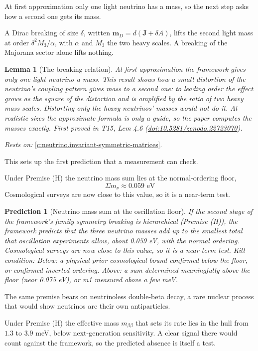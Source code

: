 \documentclass[11pt]{article}
\newtheorem{lemma}[theorem]{Lemma}
\newtheorem{prediction}[theorem]{Prediction}
\theoremstyle{definition}
\theoremstyle{plain}
\providecommand{\J}{}\renewcommand{\J}{\mathbf{J}}
\providecommand{\mD}{}\renewcommand{\mD}{\mathbf{m}_{D}}
\providecommand{\mnu}{}\renewcommand{\mnu}{\Sigma m_{\nu}}
\begin{document}
At first approximation only one light neutrino has a mass, so the next step asks how a second one gets its mass.

A Dirac breaking of size $\delta$, written $\mD = d(\J + \delta A)$, lifts the second light mass at order $\delta^{2}M_{3}/\alpha$, with $\alpha$ and $M_{3}$ the two heavy scales. A breaking of the Majorana sector alone lifts nothing.

\begin{lemma}[The breaking relation]\label{c:neutrino.breaking-relation}
At first approximation the framework gives only one light neutrino a mass. This result shows how a small distortion of the neutrino's coupling pattern gives mass to a second one: to leading order the effect grows as the square of the distortion and is amplified by the ratio of two heavy mass scales. Distorting only the heavy neutrinos' masses would not do it. At realistic sizes the approximate formula is only a guide, so the paper computes the masses exactly.
\emph{First proved in} T15, Lem 4.6 (\href{https://doi.org/10.5281/zenodo.22723070}{doi:10.5281/zenodo.22723070}).
\end{lemma}
\noindent\emph{Rests on:} \ref{c:neutrino.invariant-symmetric-matrices}.

This sets up the first prediction that a measurement can check.

Under Premise (H) the neutrino mass sum lies at the normal-ordering floor, \[ \mnu \approx 0.059 \text{ eV} \] Cosmological surveys are now close to this value, so it is a near-term test.

\begin{prediction}[Neutrino mass sum at the oscillation floor]\label{c:pred.neutrino-mass-sum-floor}
If the second stage of the framework's family symmetry breaking is hierarchical (Premise (H)), the framework predicts that the three neutrino masses add up to the smallest total that oscillation experiments allow, about 0.059 eV, with the normal ordering. Cosmological surveys are now close to this value, so it is a near-term test.
\emph{Kill condition:} Below: a physical-prior cosmological bound confirmed below the floor, or confirmed inverted ordering. Above: a sum determined meaningfully above the floor (near 0.075 eV), or m1 measured above a few meV.
\end{prediction}

The same premise bears on neutrinoless double-beta decay, a rare nuclear process that would show neutrinos are their own antiparticles.

Under Premise (H) the effective mass $m_{\beta\beta}$ that sets its rate lies in the hull from $1.3$ to $3.9$ meV, below next-generation sensitivity. A clear signal there would count against the framework, so the predicted absence is itself a test.
\end{document}
